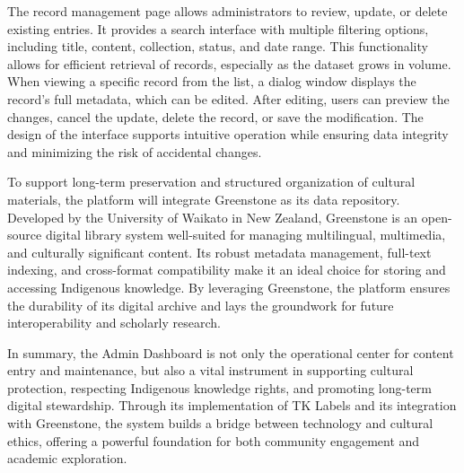 The record management page allows administrators to review, update, or delete existing entries. It provides a search interface with multiple filtering options, including title, content, collection, status, and date range. This functionality allows for efficient retrieval of records, especially as the dataset grows in volume. When viewing a specific record from the list, a dialog window displays the record's full metadata, which can be edited. After editing, users can preview the changes, cancel the update, delete the record, or save the modification. The design of the interface supports intuitive operation while ensuring data integrity and minimizing the risk of accidental changes.

To support long-term preservation and structured organization of cultural materials, the platform will integrate Greenstone as its data repository. Developed by the University of Waikato in New Zealand, Greenstone is an open-source digital library system well-suited for managing multilingual, multimedia, and culturally significant content. Its robust metadata management, full-text indexing, and cross-format compatibility make it an ideal choice for storing and accessing Indigenous knowledge. By leveraging Greenstone, the platform ensures the durability of its digital archive and lays the groundwork for future interoperability and scholarly research.

In summary, the Admin Dashboard is not only the operational center for content entry and maintenance, but also a vital instrument in supporting cultural protection, respecting Indigenous knowledge rights, and promoting long-term digital stewardship. Through its implementation of TK Labels and its integration with Greenstone, the system builds a bridge between technology and cultural ethics, offering a powerful foundation for both community engagement and academic exploration.
